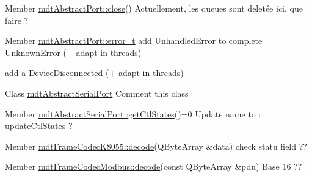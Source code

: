 \label{todo__todo000005}
\hypertarget{todo__todo000005}{}
 
\begin{DoxyDescription}
\item[Member \hyperlink{classmdt_abstract_port_a1ace1a2bd1a04f16952980e247b04800}{mdtAbstractPort::close}() ]Actuellement, les queues sont deletée ici, que faire ? 
\end{DoxyDescription}

\label{todo__todo000004}
\hypertarget{todo__todo000004}{}
 
\begin{DoxyDescription}
\item[Member \hyperlink{classmdt_abstract_port_ad4121bb930c95887e77f8bafa065a85e}{mdtAbstractPort::error\_\-t} ]add UnhandledError to complete UnknownError (+ adapt in threads) 

add a DeviceDisconnected (+ adapt in threads) 
\end{DoxyDescription}

\label{todo__todo000026}
\hypertarget{todo__todo000026}{}
 
\begin{DoxyDescription}
\item[Class \hyperlink{classmdt_abstract_serial_port}{mdtAbstractSerialPort} ]Comment this class 
\end{DoxyDescription}

\label{todo__todo000027}
\hypertarget{todo__todo000027}{}
 
\begin{DoxyDescription}
\item[Member \hyperlink{classmdt_abstract_serial_port_aaeacd26b220ab0f8c521cef74edfafdd}{mdtAbstractSerialPort::getCtlStates}()=0 ]Update name to : updateCtlStates ? 
\end{DoxyDescription}

\label{todo__todo000029}
\hypertarget{todo__todo000029}{}
 
\begin{DoxyDescription}
\item[Member \hyperlink{classmdt_frame_codec_k8055_a9dfe60529b0e80d5bbd3852fdea51b18}{mdtFrameCodecK8055::decode}(QByteArray \&data) ]check statu field ?? 
\end{DoxyDescription}

\label{todo__todo000030}
\hypertarget{todo__todo000030}{}
 
\begin{DoxyDescription}
\item[Member \hyperlink{classmdt_frame_codec_modbus_a426f465363a49d70890a462b40677787}{mdtFrameCodecModbus::decode}(const QByteArray \&pdu) ]Base 16 ?? 
\end{DoxyDescription}

